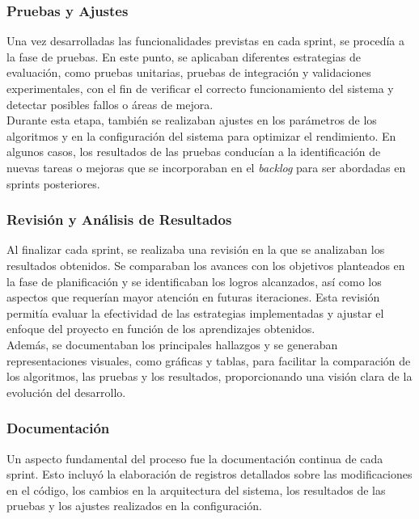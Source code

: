 \subsubsection{Pruebas y Ajustes}
Una vez desarrolladas las funcionalidades previstas en cada sprint, se procedía a la fase de pruebas.
En este punto, se aplicaban diferentes estrategias de evaluación, como pruebas unitarias, pruebas de integración y
validaciones experimentales, con el fin de verificar el correcto funcionamiento del sistema y detectar posibles fallos
o áreas de mejora.\\[6pt]

Durante esta etapa, también se realizaban ajustes en los parámetros de los algoritmos y en la configuración del sistema
para optimizar el rendimiento.
En algunos casos, los resultados de las pruebas conducían a la identificación de nuevas tareas o mejoras que se
incorporaban en el \textit{backlog} para ser abordadas en sprints posteriores.

\subsubsection{Revisión y Análisis de Resultados}
Al finalizar cada sprint, se realizaba una revisión en la que se analizaban los resultados obtenidos.
Se comparaban los avances con los objetivos planteados en la fase de planificación y se identificaban los logros
alcanzados, así como los aspectos que requerían mayor atención en futuras iteraciones.
Esta revisión permitía evaluar la efectividad de las estrategias implementadas y ajustar el enfoque del proyecto en
función de los aprendizajes obtenidos.\\[6pt]

Además, se documentaban los principales hallazgos y se generaban representaciones visuales, como gráficas y tablas,
para facilitar la comparación de los algoritmos, las pruebas y los resultados, proporcionando una visión clara de
la evolución del desarrollo.

\subsubsection{Documentación}
Un aspecto fundamental del proceso fue la documentación continua de cada sprint.
Esto incluyó la elaboración de registros detallados sobre las modificaciones en el código, los cambios en la
arquitectura del sistema, los resultados de las pruebas y los ajustes realizados en la configuración.\\[6pt]

